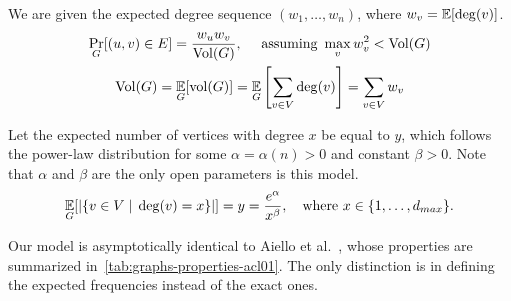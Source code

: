 We are given the expected degree sequence $(w_1,\ldots,w_n)$, where $w_v=\mathop{{}\mathbb{E}}[\deg(v)]$.
\begin{gather}
    \label{eq:powerlaw-coin-toss-edge-pr}
    \Pr_G[(u,v)\in E]=\frac{w_u w_v}{\operatorname*{Vol}(G)},
    \quad\text{ assuming }\max_v w_v^2<\operatorname*{Vol}(G)\\
    \operatorname*{Vol}(G)=\mathop{{}\mathbb{E}}_G[\operatorname*{vol}(G)]=\mathop{{}\mathbb{E}}_G\left[\sum_{v\in V} \deg(v)\right]=\sum_{v\in V} w_v
\end{gather}


Let the expected number of vertices with degree $x$ be equal to $y$,
which follows the power-law distribution for some $\alpha=\alpha(n)>0$ and constant $\beta>0$.
Note that $\alpha$ and $\beta$ are the only open parameters is this model.
\begin{equation}
    \mathop{{}\mathbb{E}}_G[|\{v \in V\;|\;\deg(v)=x\}|]=y=\frac{e^\alpha}{x^\beta},
    \quad\text{where }x\in\{1,\ldots,d_{max}\}.
\end{equation}

Our model is asymptotically identical to Aiello et al.~\cite{acl01},
whose properties are summarized in~\autoref{tab:graphs-properties-acl01}.
The only distinction is in defining the expected frequencies instead of the exact ones.


